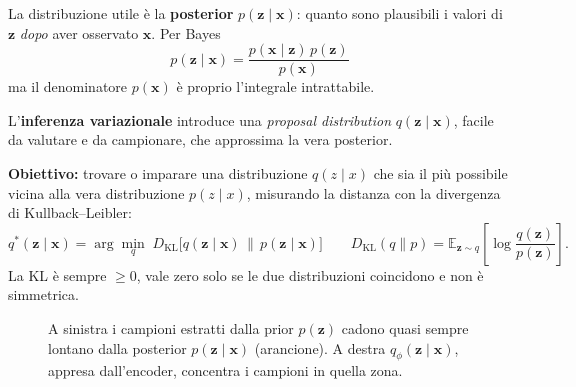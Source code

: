 \documentclass[11pt,a4paper]{article}
\providecommand{\E}{\mathbb{E}}
\providecommand{\DKL}{D_{\mathrm{KL}}}
\newcommand{\assi}{%
  \draw[->, thick] (-3.3,0) -- (3.6,0) node[right] {$\mathbf{z}$};
  \draw[->, thick] (-3.1,0) -- (-3.1,3.1) node[above] {densità};
}
\newcommand{\basefig}[1]{%
  \assi
  \fill[orange!35, domain=0.2:2.2, samples=40]
      (0.2,0) -- plot (\x, {2.4*exp(-(\x-1.2)*(\x-1.2)/0.2)}) -- (2.2,0) -- cycle;
  \draw[very thick, orange!80!black, domain=0.2:2.2, samples=40]
      plot (\x, {2.4*exp(-(\x-1.2)*(\x-1.2)/0.2)});
  \node[right, align=left, font=\small\bfseries, orange!70!black] at (1.9,2.3) {#1};
  \draw[very thick, black, domain=-3:3, samples=80]
      plot (\x, {1.3*exp(-\x*\x/2)});
  \node[left, font=\small\bfseries] at (-1.0,1.0) {$p(\mathbf{z})$};
}
\newcommand{\campioniprior}{%
  \foreach \s in {-2.4,-1.7,-1.1,-0.6,-0.1,0.4,2.3} {
    \draw[gray!70, very thick] (\s,-0.1) -- (\s,-0.4);
  }
  \draw[orange!90!black, very thick] (1.1,-0.1) -- (1.1,-0.4);
}
\newcommand{\campioniq}{%
  \foreach \s in {0.8,1.0,1.15,1.3,1.45,1.7} {
    \draw[red!80!black, very thick] (\s,-0.1) -- (\s,-0.4);
  }
}
\begin{document}
La distribuzione utile è la \textbf{posterior} $p(\mathbf{z}\mid\mathbf{x})$:
quanto sono plausibili i valori di $\mathbf{z}$ \emph{dopo} aver osservato
$\mathbf{x}$. Per Bayes
\[
p(\mathbf{z}\mid\mathbf{x})=\frac{p(\mathbf{x}\mid\mathbf{z})\,p(\mathbf{z})}{p(\mathbf{x})}
\]
ma il denominatore $p(\mathbf{x})$ è proprio l'integrale intrattabile.

L'\textbf{inferenza variazionale} introduce una \emph{proposal distribution}
$q(\mathbf{z}\mid\mathbf{x})$, facile da valutare e da campionare, che approssima
la vera posterior. 

\textbf{Obiettivo:} trovare o imparare una 
distribuzione $q(z\mid x)$ che sia il più possibile vicina alla vera 
distribuzione $p(z\mid x)$, misurando la distanza con la divergenza di Kullback--Leibler:
\[
q^*(\mathbf{z}\mid\mathbf{x})=\arg\min_q\;
\DKL\big[q(\mathbf{z}\mid\mathbf{x})\,\|\,p(\mathbf{z}\mid\mathbf{x})\big]
\qquad
\DKL(q\|p)=\E_{\mathbf{z}\sim q}\!\left[\log\frac{q(\mathbf{z})}{p(\mathbf{z})}\right].
\]
La KL è sempre $\ge 0$, vale zero solo se le due distribuzioni coincidono e non
è simmetrica.

\begin{figure}[H]
\centering
{}
\caption{A sinistra i campioni estratti dalla prior $p(\mathbf{z})$ cadono quasi sempre
lontano dalla posterior $p(\mathbf{z}\mid\mathbf{x})$ (arancione). A destra
$q_\phi(\mathbf{z}\mid\mathbf{x})$, appresa dall'encoder, concentra i campioni in quella zona.}
\end{figure}
\end{document}
